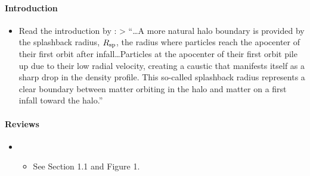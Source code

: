 \documentclass[letterpaper,10pt,english]{sphinxmanual}
\begin{document}
\paragraph{Introduction}
\label{\detokenize{resource/astro/reference/halo_splashback_radius:introduction}}\begin{itemize}
\item {} 
Read the introduction by : \textgreater{}
“…A more natural halo boundary is provided by the splashback radius,
\(R_{\rm sp}\), the radius where particles reach the apocenter of
their first orbit after infall…Particles at the apocenter of their
first orbit pile up due to their low radial velocity, creating a
caustic that manifests itself as a sharp drop in the density profile.
This so-called splashback radius represents a clear boundary between
matter orbiting in the halo and matter on a first infall toward the
halo.”

\end{itemize}



\paragraph{Reviews}
\label{\detokenize{resource/astro/reference/halo_splashback_radius:reviews}}\begin{itemize}
\item {} 
\begin{itemize}
\item {} 
See Section 1.1 and Figure 1.

\end{itemize}

\end{itemize}
\end{document}

